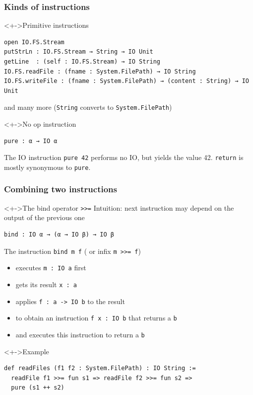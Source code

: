 \documentclass{beamer}
\begin{document}
\begin{frame}[fragile]
  \frametitle{Kinds of instructions}
  \begin{block}<+->{Primitive instructions}
\begin{lstlisting}
open IO.FS.Stream
putStrLn : IO.FS.Stream → String → IO Unit
getLine  : (self : IO.FS.Stream) → IO String
IO.FS.readFile : (fname : System.FilePath) → IO String
IO.FS.writeFile : (fname : System.FilePath) → (content : String) → IO Unit
\end{lstlisting}
and many more (\lstinline|String| converts to \lstinline|System.FilePath|)
  \end{block}
  \begin{block}<+->{No op instruction}
\begin{lstlisting}
pure : α → IO α
\end{lstlisting}
    The IO instruction \lstinline{pure 42} performs no IO, but yields the value
    42.  \lstinline{return} is mostly synonymous to \lstinline{pure}.
  \end{block}
\end{frame}
\begin{frame}[fragile]
  \frametitle{Combining two instructions}
  \begin{block}<+->{The bind operator \texttt{>>=}}
    Intuition:  next instruction may depend on the output of the previous one
\begin{lstlisting}
bind : IO α → (α → IO β) → IO β
\end{lstlisting}
    The instruction \lstinline{bind m f} ( or infix \lstinline{m >>= f})
    \begin{itemize}
    \item executes \texttt{m : IO a} first
    \item gets its result \texttt{x : a}
    \item applies \texttt{f : a -> IO b} to the result
    \item to obtain an instruction \texttt{f x : IO b} that returns a \texttt{b}
    \item and executes this instruction to return a \texttt{b}
    \end{itemize}
  \end{block}
  \begin{exampleblock}<+->{Example}
\begin{lstlisting}
def readFiles (f1 f2 : System.FilePath) : IO String :=
  readFile f1 >>= fun s1 => readFile f2 >>= fun s2 =>
  pure (s1 ++ s2)
\end{lstlisting}
  \end{exampleblock}
\end{frame}
\end{document}
